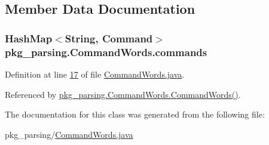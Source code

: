 \subsection{Member Data Documentation}
\hypertarget{classpkg__parsing_1_1CommandWords_a82467831861a15539131a50c22e826fc}{
\subsubsection[{commands}]{\setlength{\rightskip}{0pt plus 5cm}Hash\-Map$<$String, {\bf Command}$>$ pkg\-\_\-parsing.\-Command\-Words.\-commands\hspace{0.3cm}{\ttfamily [private]}}}\label{classpkg__parsing_1_1CommandWords_a82467831861a15539131a50c22e826fc}


Definition at line \hyperlink{CommandWords_8java_source_l00017}{17} of file \hyperlink{CommandWords_8java_source}{Command\-Words.\-java}.



Referenced by \hyperlink{CommandWords_8java_source_l00022}{pkg\-\_\-parsing.\-Command\-Words.\-Command\-Words()}.



The documentation for this class was generated from the following file\-:\begin{DoxyCompactItemize}
\item 
pkg\-\_\-parsing/\hyperlink{CommandWords_8java}{Command\-Words.\-java}\end{DoxyCompactItemize}
